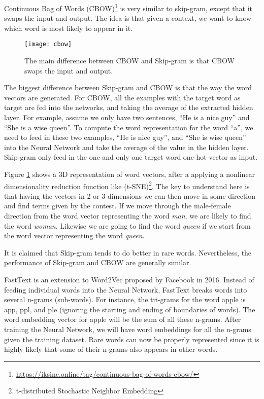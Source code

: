 Continuous Bag of Words (CBOW)\footnote{\url{https://iksinc.online/tag/continuous-bag-of-words-cbow/}} is very similar to skip-gram, except that it swaps the input and output. The idea is that given a context, we want to know which word is most likely to appear in it.

\begin{figure}[ht]
	\centering
	\texttt{[image: cbow]}
	\caption[CBOW and Skip-gram]{The main difference between CBOW and Skip-gram is that CBOW swaps the input and output.}
	\label{fig:cbow}
\end{figure}


The biggest difference between Skip-gram and CBOW is that the way the word vectors are generated. For CBOW, all the examples with the target word as target are fed into the networks, and taking the average of the extracted hidden layer. For example, assume we only have two sentences, “He is a nice guy” and “She is a wise queen”. To compute the word representation for the word “a”, we need to feed in these two examples, “He is nice guy”, and “She is wise queen” into the Neural Network and take the average of the value in the hidden layer. Skip-gram only feed in the one and only one target word one-hot vector as input.

Figure \ref{fig:cbow} shows a 3D representation of word vectors, after a applying a nonlinear dimensionality reduction function like (t-SNE)\footnote{t-distributed Stochastic Neighbor Embedding}\cite{maaten2008visualizing}. The key to understand here is that having the vectors in 2 or 3 dimensions we can then move in some direction and find terms given by the contest. If we move through the male-female direction from the word vector representing the word \textit{man}, we are likely to find the word \textit{woman}. Likewise we are going to find the word \textit{queen} if we start from the word vector representing the word \textit{queen}.

It is claimed that Skip-gram tends to do better in rare words. Nevertheless, the performance of Skip-gram and CBOW are generally similar.



FastText is an extension to Word2Vec proposed by Facebook in 2016. Instead of feeding individual words into the Neural Network, FastText breaks words into several n-grams (sub-words). For instance, the tri-grams for the word apple is app, ppl, and ple (ignoring the starting and ending of boundaries of words). The word embedding vector for apple will be the sum of all these n-grams. After training the Neural Network, we will have word embeddings for all the n-grams given the training dataset. Rare words can now be properly represented since it is highly likely that some of their n-grams also appears in other words.\cite{word2vecFastText}


